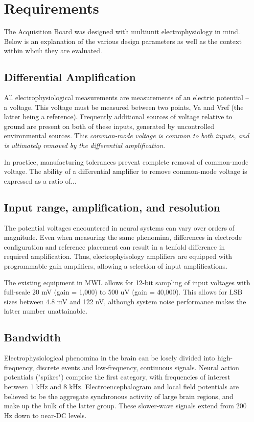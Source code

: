 
\section{Requirements}

The Acquisition Board was designed with multiunit electrophysiology in
mind. Below is an explanation of the various design parameters as well
as the context within whcih they are evaluated.

\subsection{Differential Amplification}
All electrophysiological measurements are measurements of an electric
potential -- a voltage. This voltage must be measured between two
points, Va and Vref (the latter being a reference). Frequently
additional sources of voltage relative to ground are present on both
of these inputs, generated by uncontrolled environmental sources. This
\em{common-mode voltage} is common to both inputs, and is ultimately
removed by the differential amplification.

 
In practice, manufacturing tolerances prevent complete removal of
common-mode voltage. The ability of a differential amplifier to remove
common-mode voltage is expressed as a ratio of...


\subsection{Input range, amplification, and resolution}

The potential voltages encountered in neural systems can
vary over orders of magnitude. Even when measuring the same
phenomina, differences in electrode configuration and reference
placement can result in a tenfold difference in required
amplification. Thus, electrophyisology amplifiers are equipped
with programmable gain amplifiers, allowing a selection of input
amplifications. 

The existing equipment in MWL allows for 12-bit sampling
of input voltages with full-scale 20 mV (gain = 1,000) to 500 uV
(gain = 40,000). This allows for LSB sizes between 4.8 mV and
122 nV, although system noise performance makes the latter
number unattainable.  

\subsection{Bandwidth}

Electrophysiological phenomina in the brain can be losely divided into
high-frequency, discrete events and low-frequency, continuous signals.
Neural action potentials ("spikes") comprise the first category, with
frequencies of interest between 1 kHz and 8 kHz. Electroencephalogram
and local field potentials are believed to be the aggregate
synchronous activity of large brain regions, and make up the bulk of
the latter group. These slower-wave signals extend from 200 Hz down to
near-DC levels.


